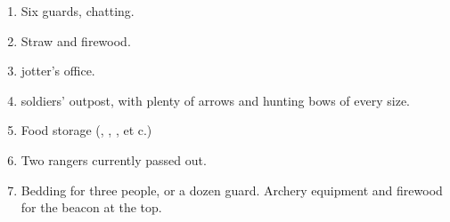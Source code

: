 \begin{multicols}{2}
\begin{enumerate}
  \item
  Six \glspl{guard}, chatting.
  \label{cinderBase}
  \item
  Straw and firewood.
  \label{cinderStraw}
  \item
  \Gls{jotter}'s office.
  \label{cinderOffice}
  \item
  \Glspl{soldier}' outpost, with plenty of arrows and hunting bows of every size.
  \label{cinderBows}
  \item
  Food storage (\rations, \rations, \rations, et c.)
  \label{cinderFood}
  \item
  Two \glspl{ranger} currently passed out.
  \label{cinderUpper}
  \item
  Bedding for three people, or a dozen \gls{guard}.
  Archery equipment and firewood for the beacon at the top.
  \label{cinderBeds}
\end{enumerate}

\end{multicols}
